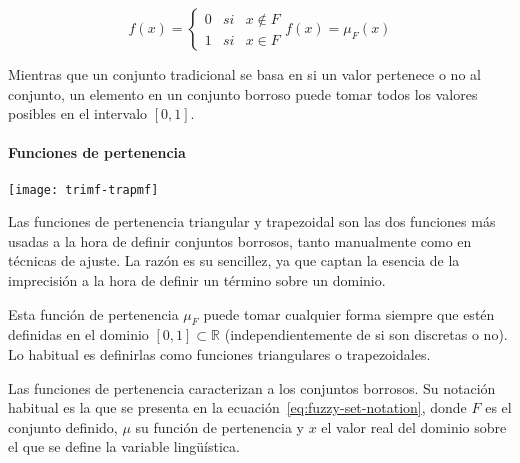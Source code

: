 \begin{subequations}
	\begin{equation}
		f(x) = \left\{
			\begin{array}{lcc}
				0 & si & x \notin F \\
				1 & si & x \in F
			\end{array}
		\right.
		\label{eq:characteristic-function}
	\end{equation}
	\begin{equation}
		f(x) = \mu_F(x)
		\label{eq:membership-function}
	\end{equation}
\end{subequations}

Mientras que un conjunto tradicional se basa en si un valor pertenece o no al conjunto, un elemento en un conjunto borroso puede tomar todos los valores posibles en el intervalo $[0, 1]$.

\paragraph{Funciones de pertenencia}

\begin{marginfigure}
	\centering
	\texttt{[image: trimf-trapmf]}
	\caption[Gráfica de funciones de pertenencia triangular y trapezoidal]{Las funciones de pertenencia triangular y trapezoidal son las dos funciones más usadas a la hora de definir conjuntos borrosos, tanto manualmente como en técnicas de ajuste. La razón es su sencillez, ya que captan la esencia de la imprecisión a la hora de definir un término sobre un dominio.}
	\label{fig:trimf-trapmf}
\end{marginfigure}

Esta función de pertenencia $\mu_F$ puede tomar cualquier forma siempre que estén definidas en el dominio $[0, 1] \subset \mathbb{R}$ (independientemente de si son discretas o no). Lo habitual es definirlas como funciones triangulares o trapezoidales.

Las funciones de pertenencia caracterizan a los conjuntos borrosos. Su notación habitual es la que se presenta en la ecuación~\ref{eq:fuzzy-set-notation}, donde $F$ es el conjunto definido, $\mu$ su función de pertenencia y $x$ el valor real del dominio sobre el que se define la variable lingüística.

